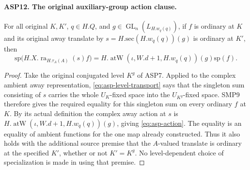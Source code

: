 \documentclass[11pt,a4paper]{article}
\numberwithin{equation}{section}
\theoremstyle{remark}\newtheorem{remark}[theorem]{Remark}
\begin{document}
\paragraph{ASP12. The original auxiliary-group action clause.}
\label{claim:ASP12}
For all original $K,\allowbreak{} K'$, $q\in H.Q$, and
$g\in\operatorname{GL}_n(L_{H.w_q(q)})$,
if $f$ is ordinary at $K$ and its original
away translate by $s=H.\mathrm{sec}(H.w_q(q))(g)$
is ordinary at $K'$, then
\begin{equation}\label{eq:asp-action}
       \mathrm{sp}\bigl(H.X.\operatorname{ra}_{H.\tau_A(A)}(s)f\bigr)
          =H.\operatorname{atW}(\iota,\allowbreak{} W.d+1,\allowbreak{} H.w_q(q))(g)
                                                       \mathrm{sp}(f).
\end{equation}
\begin{proof}
Take the original conjugated level $K^g$ of ASP7.
Applied to the complex ambient away representation,
\eqref{eq:asp-level-transport} says that the singleton
sum consisting of $s$ carries the whole
$U_K$-fixed space into the $U_{K^g}$-fixed space.
SMP9 therefore gives the required equality for
this singleton sum on every ordinary $f$ at $K$.
By its actual definition the complex away action
at $s$ is
$H.\operatorname{atW}(\iota,\allowbreak{} W.d+1,\allowbreak{} H.w_q(q))(g)$,
giving \eqref{eq:asp-action}.
The equality is an equality of ambient functions
for the one map already constructed.  Thus it
also holds with the additional source premise
that the $A$-valued translate is ordinary at the
specified $K'$, whether or not $K'=K^g$.
No level-dependent choice of specialization is
made in using that premise.
\end{proof}

\end{document}
